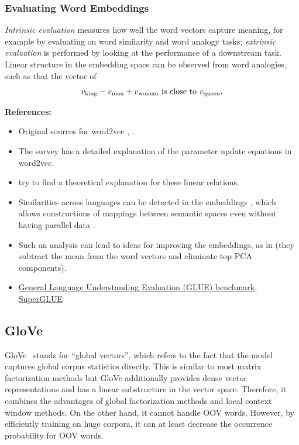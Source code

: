 \documentclass[11pt, a4paper]{amsart}
\begin{document}
\subsubsection{Evaluating Word Embeddings}

\emph{Intrinsic evaluation} measures how well the word vectors capture meaning, for example by evaluating on word similarity and word analogy tasks;
\emph{extrinsic evaluation} is performed by looking at the performance of a downstream task.
Linear structure in the embedding space can be observed from word analogies, such as that the vector of
\[
v_{\textup{king}} - v_{\textup{man}} + v_{\textup{woman}} \text{ is close to } v_{\textup{queen}}.
\]


\noindent \textbf{References:}
\begin{itemize}
	\item Original sources for word2vec
	\cite{DBLP:journals/corr/abs-1301-3781},
	\cite{DBLP:journals/corr/MikolovSCCD13}.
	\item The survey \cite{DBLP:journals/corr/Rong14} has a detailed explanation of the parameter update equations in word2vec.
    \item \cite{DBLP:journals/corr/abs-1901-09813} try to find a theoretical explanation for these linear relations.
    \item Similarities across languages can be detected in the embeddings \cite{DBLP:journals/corr/MikolovLS13}, which allows constructions of mappings between semantic spaces even without having parallel data \cite{DBLP:journals/corr/abs-1710-04087}.
    \item Such an analysis can lead to ideas for improving the embeddings, as in \cite{DBLP:journals/corr/MuBV17} (they subtract the mean from the word vectors and eliminate top PCA components).
    \item \href{https://gluebenchmark.com/}{General Language Understanding Evaluation (GLUE) benchmark}, \href{https://super.gluebenchmark.com/}{SuperGLUE}
\end{itemize}


\subsection{GloVe}

GloVe~\cite{pennington-etal-2014-glove} stands for ``global vectors'', which refers to the fact that the model captures global corpus statistics directly. 
This is similar to most matrix factorization methods but GloVe additionally provides dense vector representations and has a linear substructure in the vector space. 
Therefore, it combines the advantages of global factorization methods and local context window methods. 
On the other hand, it cannot handle OOV words. However, by efficiently training on huge corpora, it can at least decrease the occurrence probability for OOV words. \\
\end{document}
